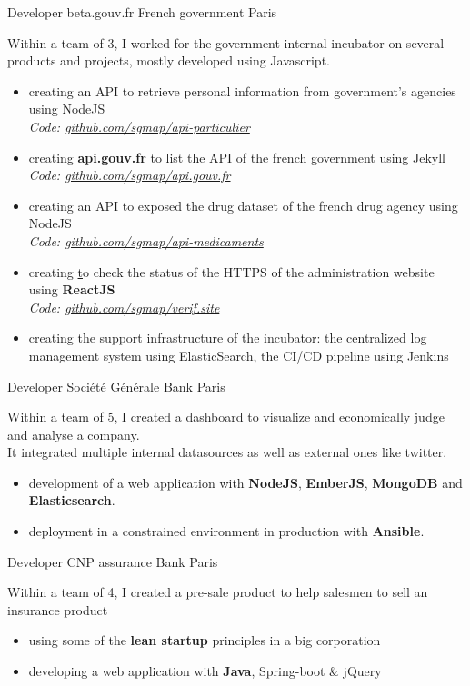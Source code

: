\documentclass[11pt,a4paper]{moderncv}
\begin{document}
{Developer}
{beta.gouv.fr}
{French government}
{Paris}
{
Within a team of 3, I worked for the government internal incubator on several products and projects, mostly developed using Javascript.
\begin{itemize}
\item creating an API to retrieve personal information from  government's agencies using NodeJS
\\
\textit{Code: \href{https://github.com/sgmap/api-particulier}{github.com/sgmap/api-particulier}}
\item creating \textbf{\url{api.gouv.fr}} to list the API of the french government using Jekyll
\\
\textit{Code: \href{https://github.com/sgmap/api.gouv.fr}{github.com/sgmap/api.gouv.fr}}
\item creating an API to exposed the drug dataset of the french drug agency using NodeJS
\\
\textit{Code: \href{https://github.com/sgmap/api-medicaments}{github.com/sgmap/api-medicaments}}
\item creating \href{verif.site} to check the status of the HTTPS of the administration website using \textbf{ReactJS}
\\
\textit{Code: \href{https://github.com/sgmap/verif.site}{github.com/sgmap/verif.site}}
\item creating the support infrastructure of the incubator: the centralized log management system using ElasticSearch, the CI/CD pipeline using Jenkins
\end{itemize}
\vspace{5mm}
}

{Developer}
{Société Générale}
{Bank}
{Paris}
{
Within a team of 5, I created a dashboard to visualize and economically judge and analyse a company.\\
It integrated multiple internal datasources as well as external ones like twitter.
\begin{itemize}
\item development of a web application with \textbf{NodeJS}, \textbf{EmberJS}, \textbf{MongoDB} and \textbf{Elasticsearch}.
\item deployment in a constrained environment in production with \textbf{Ansible}.
\end{itemize}
\vspace{5mm}
}

{Developer}
{CNP assurance}
{Bank}
{Paris}
{
Within a team of 4, I created a pre-sale product to help salesmen to sell an insurance product
\begin{itemize}
\item using some of the \textbf{lean startup} principles in a big corporation
\item developing a web application with \textbf{Java}, Spring-boot \& jQuery
\end{itemize}
\vspace{5mm}
}
\end{document}
